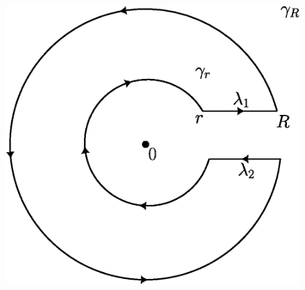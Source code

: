 \begin{example}
\begin{enumerate}
            \begin{figure}[h]
               \centering
               \includegraphics[scale=0.5]{Figures/chapter5/contour_3.eps}
               \caption{}
               \label{figure_5.5}
           \end{figure}


\end{enumerate}
\end{example}
